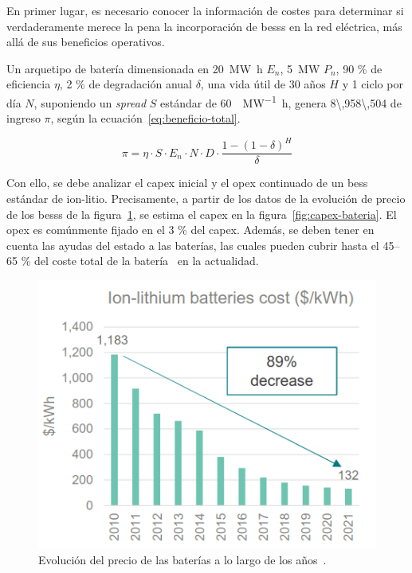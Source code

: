 En primer lugar, es necesario conocer la información de costes para determinar si verdaderamente merece la pena la incorporación de \glspl{bess} en la red eléctrica, más allá de sus beneficios operativos.

Un arquetipo de batería dimensionada en \SI{20}{\mega\watt\hour} \( E_{n} \), \SI{5}{\mega\watt} \( P_{n} \), 90 \% de eficiencia \( \eta \), 2 \% de degradación anual \( \delta \), una vida útil de 30 años \( H \) y 1 ciclo por día \( N \), suponiendo un \textit{spread} \( S \) estándar de \SI{60}{\text{\euro}\per\mega\watt\hour}, genera \SI{8\,958\,504}{\text{\euro}} de ingreso \( \pi \), según la ecuación~\ref{eq:beneficio-total}.

\begin{equation}%
  \label{eq:beneficio-total}
  \pi = \eta \cdot S \cdot E_{n} \cdot N \cdot D \cdot \frac{1 - {(1 - \delta)}^{H}}{\delta}
\end{equation}

Con ello, se debe analizar el \gls{capex} inicial y el \gls{opex} continuado de un \gls{bess} estándar de ion-litio. Precisamente, a partir de los datos de la evolución de precio de los \glspl{bess} de la figura~\ref{fig:precio-bateria}, se estima el \gls{capex} en la figura~\ref{fig:capex-bateria}. El \gls{opex} es comúnmente fijado en el 3 \% del \gls{capex}. Además, se deben tener en cuenta las ayudas del estado a las baterías, las cuales pueden cubrir hasta el 45--65 \% del coste total de la batería~\cite{solfy2025subvenciones} en la actualidad.

\begin{figure}
  \centering
  \includegraphics[width=0.5\linewidth]{figures/precio-bateria.png}
  \caption[Evolución del precio de las baterías a lo largo de los años.]{Evolución del precio de las baterías a lo largo de los años~\cite{bnef2025strategic}.}%
  \label{fig:precio-bateria}
\end{figure}

